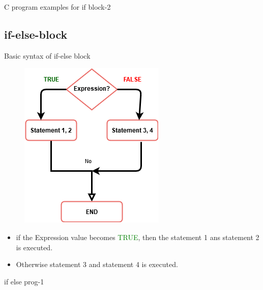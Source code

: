 \documentclass[10pt,a4paper]{beamer}
\begin{document}
       \begin{frame}{C program examples for if block-2}
             
        \end{frame}
    
 \subsection{if-else-block}
    \begin{frame}{Basic syntax of if-else block}
        \begin{minipage}{0.3 \linewidth}
            
        \end{minipage}%
        \begin{minipage}{0.7 \linewidth}
            \begin{figure}
            	    \centering
            	    \includegraphics[height=5 cm, width=4 cm]{images/if-else-syntax.png}
        	\end{figure}
        \end{minipage}
        
        \begin{itemize}
            \item if the Expression value becomes \textcolor{green}{TRUE}, then the statement 1 ans statement 2 is executed.
            \item Otherwise statement 3 and statement 4 is executed.
        \end{itemize}    
        
    \end{frame}
    
    \begin{frame}{if else prog-1}
        
    \end{frame}
    
\end{document}
